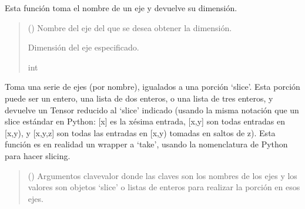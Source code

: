 \documentclass[letterpaper,10pt,english]{sphinxmanual}
\begin{document}
\begin{fulllineitems}
\begin{fulllineitems}
\label{\detokenize{utils.tensor:utils.tensor.Tensor.size}}
\pysigstartsignatures
{}
\pysigstopsignatures
\sphinxAtStartPar
Esta función toma el nombre de un eje y devuelve su dimensión.
\begin{quote}\begin{description}
\sphinxAtStartPar
{} () \textendash{} Nombre del eje del que se desea obtener la dimensión.

\sphinxAtStartPar
Dimensión del eje especificado.

\sphinxAtStartPar
int

\end{description}\end{quote}

\end{fulllineitems}


\begin{fulllineitems}
\label{\detokenize{utils.tensor:utils.tensor.Tensor.slice}}
\pysigstartsignatures
{}
\pysigstopsignatures
\sphinxAtStartPar
Toma una serie de ejes (por nombre), igualados a una porción ‘slice’. Esta porción puede ser
un entero, una lista de dos enteros, o una lista de tres enteros, y devuelve un Tensor reducido al ‘slice’
indicado (usando la misma notación que un slice estándar en Python: {[}x{]} es la x\sphinxhyphen{}ésima entrada, {[}x,y{]} son
todas entradas en {[}x,y), y {[}x,y,z{]} son todas las entradas en {[}x,y) tomadas en saltos de z). Esta función
es en realidad un wrapper a ‘take’, usando la nomenclatura de Python para hacer slicing.
\begin{quote}\begin{description}
\sphinxAtStartPar
{} () \textendash{} Argumentos clave\sphinxhyphen{}valor donde las claves son los nombres de los ejes y los valores
son objetos ‘slice’ o listas de enteros para realizar la porción en esos ejes.


\end{description}
\end{quote}
\end{fulllineitems}
\end{fulllineitems}
\end{document}
